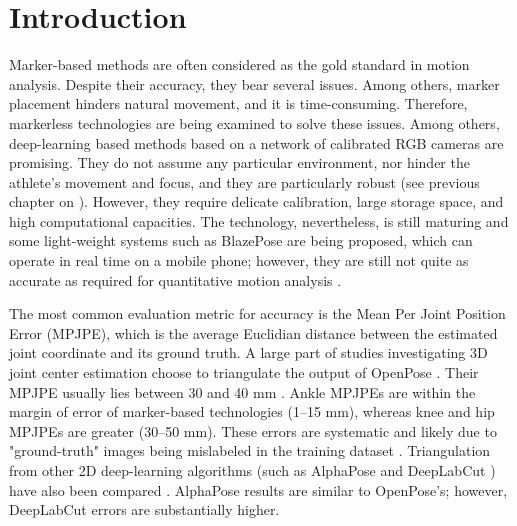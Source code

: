 \newpage


\section{Introduction}

Marker-based methods are often considered as the gold standard in motion analysis. Despite their accuracy, they bear several issues. Among others, marker placement hinders natural movement, and it is time-consuming. Therefore, markerless technologies are being examined to solve these issues. Among others, deep-learning based methods based on a network of calibrated RGB cameras are promising. They do not assume any particular environment, nor hinder the athlete’s movement and focus, and they are particularly robust (see previous chapter on  \cite{Pagnon2021}). However, they require delicate calibration, large storage space, and high computational capacities. The technology, nevertheless, is still maturing and some light-weight systems such as BlazePose \cite{Bazarevsky2020} are being proposed, which can operate in real time on a mobile phone; however, they are still not quite as accurate as required for quantitative motion analysis \cite{Mroz2021}.

The most common evaluation metric for accuracy is the Mean Per Joint Position Error (MPJPE), which is the average Euclidian distance between the estimated joint coordinate and its ground truth. A large part of studies investigating 3D joint center estimation choose to triangulate the output of OpenPose \cite{Cao2019}. Their MPJPE usually lies between 30 and 40 mm \cite{Nakano2019,Slembrouck2020,Labuguen2020}. Ankle MPJPEs are within the margin of error of marker-based technologies (1–15 mm), whereas knee and hip MPJPEs are greater (30–50 mm). These errors are systematic and likely due to "ground-truth" images being mislabeled in the training dataset \cite{Needham2021b}. Triangulation from other 2D deep-learning algorithms (such as AlphaPose \cite{Fang2017} and DeepLabCut \cite{Mathis2018}) have also been compared \cite{Needham2021b}. AlphaPose results are similar to OpenPose’s; however, DeepLabCut errors are substantially higher.

